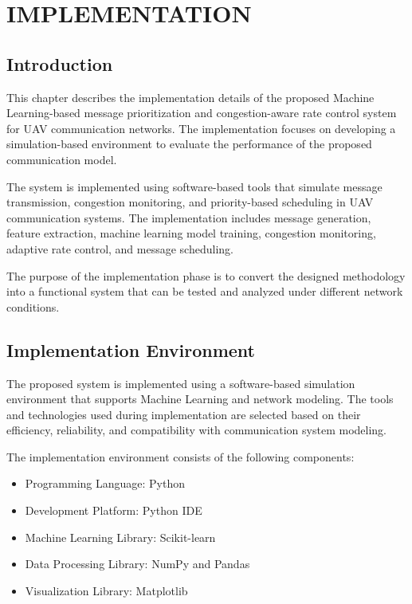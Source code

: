 \chapter{IMPLEMENTATION}

\section{Introduction}

This chapter describes the implementation details of the proposed 
Machine Learning-based message prioritization and congestion-aware 
rate control system for UAV communication networks. The implementation 
focuses on developing a simulation-based environment to evaluate the 
performance of the proposed communication model.

The system is implemented using software-based tools that simulate 
message transmission, congestion monitoring, and priority-based 
scheduling in UAV communication systems. The implementation includes 
message generation, feature extraction, machine learning model 
training, congestion monitoring, adaptive rate control, and message 
scheduling.

The purpose of the implementation phase is to convert the designed 
methodology into a functional system that can be tested and analyzed 
under different network conditions.


\section{Implementation Environment}

The proposed system is implemented using a software-based simulation 
environment that supports Machine Learning and network modeling. 
The tools and technologies used during implementation are selected 
based on their efficiency, reliability, and compatibility with 
communication system modeling.

The implementation environment consists of the following components:

\begin{itemize}

\item Programming Language: Python

\item Development Platform: Python IDE

\item Machine Learning Library: Scikit-learn

\item Data Processing Library: NumPy and Pandas

\item Visualization Library: Matplotlib


\end{itemize}

